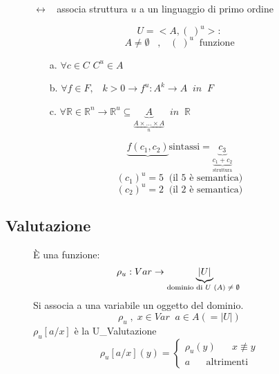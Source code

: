 \documentclass{article}
\theoremstyle{break}
\theoremstyle{break}
\theoremstyle{break}
\theoremstyle{break}
\begin{document}
\begin{figure}[H]
  \begin{definition}[L\_Struttura]
    \(
  \leftrightarrow\;\;     \) associa struttura \( u \) a un linguaggio di primo ordine

    \[
    U = <A, (\;)^u>:
    \] 
    \[
    A \neq \emptyset \;\;\;,\;\;\; (\;)^u \;\;\text{funzione}
    \]
    \begin{itemize}
      \item[a.] \( \forall c \in C \) \( C^u \in A \) 
      \item[b.] \( \forall f \in F, \;\;\; k>0 \to f^u : A^k \to A \;\; in \;\;F \) 
      \item [c.] \( \forall \mathbb{R} \in \mathbb{R}^n \to \mathbb{R}^u \subseteq \underbrace{A}_{\underbrace{A \times \ldots \times A}_{n}} \;\; in \;\;\mathbb{R} \) 
    \end{itemize}
  \end{definition}
  \[
    \underbrace{f(c_1,c_2)}{\text{sintassi}} = \underbrace{c_3}_{\underbrace{c_1+c_2}_{\text{struttura}}}
  \] 
  \[
    (c_1)^u = 5 \;\;\text{(il 5 è semantica)}
  \] 
  \[
    (c_2)^u = 2 \;\;\text{(il 2 è semantica)}
  \] 
\end{figure}

\subsection{Valutazione}

\begin{figure}[H]
  \begin{definition}
    È una funzione:
    \[
      \rho_u: Var \to \underbrace{|U|}_{\text{dominio di \( U \) \( (A) \neq \emptyset \)  }}
    \] 
    Si associa a una variabile un oggetto del dominio.
    \[
    \rho_u\;,\; x \in Var \;\; a \in A (=|U|)
    \] 
    \(
      \rho_u[a/x]
    \) è la U\_Valutazione
    \[
      \rho_u[a/x](y)= \begin{cases}
        \rho_u(y)\;\;\;\;\;\; x \not\equiv y\\
        a \;\;\;\;\;\; \text{altrimenti}
      \end{cases}    \] 
  \end{definition}
\end{figure}
\end{document}
